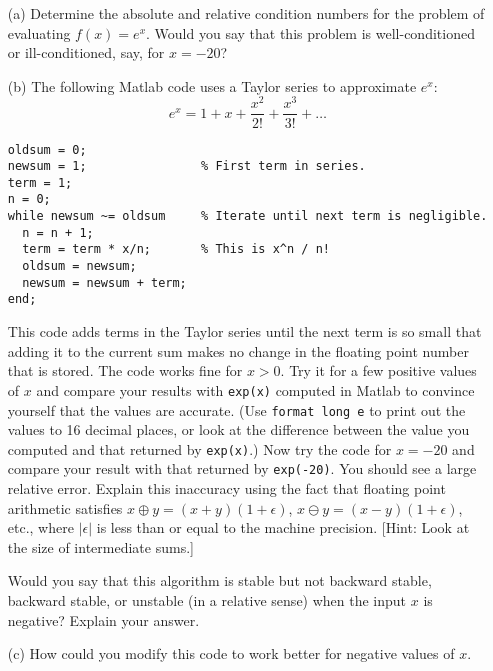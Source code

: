 \documentclass[10pt]{article}
\begin{document}
\begin{problem}[Exercise 4]
    \begin{enumerate}
        \item[(a)] Determine the absolute and relative condition numbers for the problem of evaluating $f(x) = e^x$. Would you say that this problem is well-conditioned or ill-conditioned, say, for $x=-20$?
        \item[(b)] The following Matlab code uses a Taylor series to approximate $e^x$:
    \[ e^x = 1 + x + \frac{x^2}{2!} + \frac{x^3}{3!} + \ldots \]
\begin{lstlisting}
oldsum = 0;
newsum = 1;                % First term in series.
term = 1;
n = 0;
while newsum ~= oldsum     % Iterate until next term is negligible.
  n = n + 1;
  term = term * x/n;       % This is x^n / n!
  oldsum = newsum;
  newsum = newsum + term;
end;
\end{lstlisting}
This code adds terms in the Taylor series until the next term is so small that adding it to the current sum makes no change in the floating point number that is stored.  The code works fine for $x > 0$.  Try it for a few positive values of $x$ and compare your results with {\tt exp(x)} computed in Matlab to convince yourself that the values are accurate. (Use {\tt format long e} to print out the values to 16 decimal places, or look at the difference between the value you computed and that returned by {\tt exp(x)}.) Now try the code for $x=-20$ and compare your result with that returned by {\tt exp(-20)}. You should see a large relative error.  Explain this inaccuracy using the fact that floating point arithmetic satisfies $x \oplus y = (x+y)(1 + \epsilon )$, $x \ominus y = (x-y)(1 + \epsilon )$, etc., where $| \epsilon |$ is less than or equal to the machine precision.  [Hint:  Look at the size of intermediate sums.]

Would you say that this algorithm is stable but not backward stable, backward stable, or unstable (in a relative sense) when the input $x$ is negative?  Explain your answer.
\item[(c)] How could you modify this code to work better for negative values of $x$.
    \end{enumerate}
\end{problem}
\end{document}
